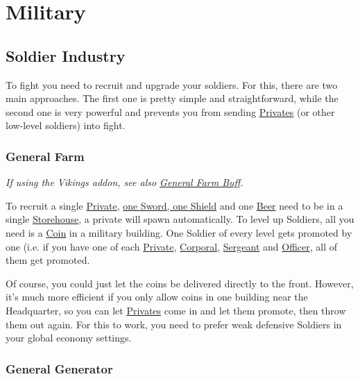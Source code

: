 \documentclass[12pt]{article}
\begin{document}
\section{Military}
\label{sec:military}

\subsection{Soldier Industry}

To fight you need to recruit and upgrade your soldiers. For this, there are two main approaches. The first one is pretty simple and straightforward, while the second one is very powerful and prevents you from sending \hyperref[sec:privates]{Privates} (or other low-level soldiers) into fight.

\subsubsection{General Farm}
\label{sec:generalfarm}

\textit{If using the Vikings addon, see also \hyperref[sec:generalfarmbuff]{General Farm Buff}.}

\vspace{12pt}

To recruit a single \hyperref[sec:private]{Private}, \hyperref[sec:smithy]{one Sword, one Shield} and one \hyperref[sec:brewery]{Beer} need to be in a single \hyperref[sec:storehouse]{Storehouse}, a private will spawn automatically. To level up Soldiers, all you need is a \hyperref[sec:mint]{Coin} in a military building. One Soldier of every level gets promoted by one (i.e. if you have one of each \hyperref[sec:private]{Private}, \hyperref[sec:corporal]{Corporal}, \hyperref[sec:sergeant]{Sergeant} and \hyperref[sec:officer]{Officer}, all of them get promoted.

Of course, you could just let the coins be delivered directly to the front. However, it's much more efficient if you only allow coins in one building near the Headquarter, so you can let \hyperref[sec:private]{Privates} come in and let them promote, then throw them out again. For this to work, you need to prefer weak defensive Soldiers in your global economy settings.

\subsubsection{General Generator}
\label{sec:generalgenerator}
\end{document}
